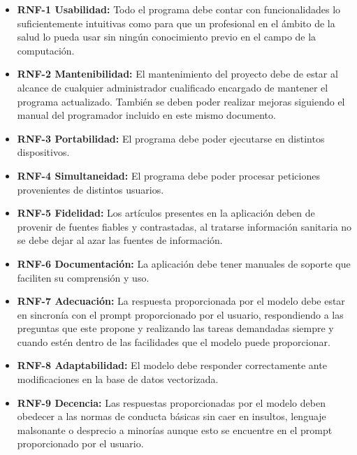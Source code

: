 \begin{itemize}
  \item \textbf{RNF-1 Usabilidad:} Todo el programa debe contar con funcionalidades lo suficientemente intuitivas como para que un profesional en el ámbito de la salud lo pueda usar sin ningún conocimiento previo en el campo de la computación.
  
  \item \textbf{RNF-2 Mantenibilidad:} El mantenimiento del proyecto debe de estar al alcance de cualquier administrador cualificado encargado de mantener el programa actualizado. También se deben poder realizar mejoras siguiendo el manual del programador incluido en este mismo documento.
  
  \item \textbf{RNF-3 Portabilidad:} El programa debe poder ejecutarse en distintos dispositivos.
  
  \item \textbf{RNF-4 Simultaneidad:} El programa debe poder procesar peticiones provenientes de distintos usuarios.
  
  \item \textbf{RNF-5 Fidelidad:} Los artículos presentes en la aplicación deben de provenir de fuentes fiables y contrastadas, al tratarse información sanitaria no se debe dejar al azar las fuentes de información.
  
  \item \textbf{RNF-6 Documentación:} La aplicación debe tener manuales de soporte que faciliten su comprensión y uso.
  
  \item \textbf{RNF-7 Adecuación:} La respuesta proporcionada por el modelo debe estar en sincronía con el prompt proporcionado por el usuario, respondiendo a las preguntas que este propone y realizando las tareas demandadas siempre y cuando estén dentro de las facilidades que el modelo puede proporcionar.

  \item \textbf{RNF-8 Adaptabilidad:} El modelo debe responder correctamente ante modificaciones en la base de datos vectorizada.

  \item \textbf{RNF-9 Decencia:} Las respuestas proporcionadas por el modelo deben obedecer a las normas de conducta básicas sin caer en insultos, lenguaje malsonante o desprecio a minorías aunque esto se encuentre en el prompt proporcionado por el usuario.
  
\end{itemize}


